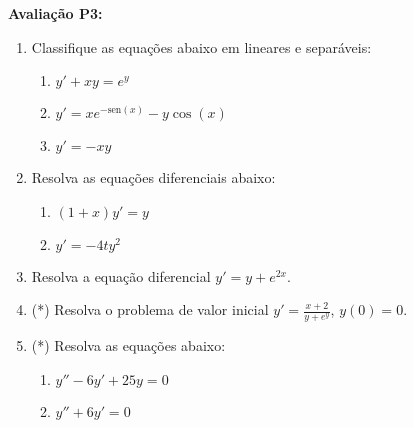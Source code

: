 \documentclass{article}
\newcommand{\ds}{\displaystyle}
\newcommand{\sen}{\mbox{sen}}
\begin{document}
{\bf Avalia\c{c}\~ao P3:}
\begin{enumerate}
\item Classifique as equa\c{c}\~oes abaixo em lineares e separ\'aveis:
	\begin{enumerate}
		\item $\ds y'+xy=e^y$
		\item $\ds y' = xe^{-\sen(x)} - y\cos(x)$
		\item $\ds y' = -xy$
	\end{enumerate}

\item Resolva as equa\c{c}\~oes diferenciais abaixo:
	\begin{enumerate}
		\item $(1+x)y' = y$
		\item $y' = -4ty^2$
	\end{enumerate}

\item Resolva a equa\c{c}\~ao diferencial $y'=y+e^{2x}$.

\item (*) Resolva o problema de valor inicial $\ds y' = \frac{x+2}{y+e^y}$, $y(0)=0$.

\item (*) Resolva as equa\c{c}\~oes abaixo:
	\begin{enumerate}
		\item $y''-6y'+25y=0$
		\item$y''+6y'=0$
	\end{enumerate}

\end{enumerate}
\end{document}
